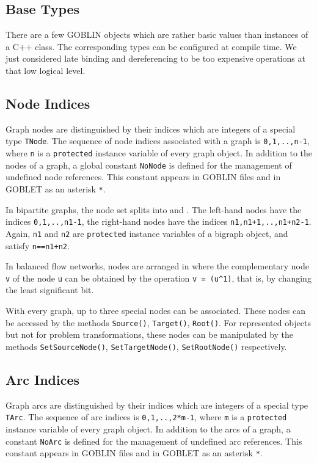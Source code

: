 \documentclass[a4paper,11pt,twoside]{book}
\begin{document}
\begin{multicols}{2}
\section{Base Types}

There are a few GOBLIN objects which are rather basic values than instances
of a C++ class. The corresponding types can be configured at compile time.
We just considered late binding and dereferencing to be too expensive
operations at that low logical level.


\subsection{Node Indices}

Graph nodes are distinguished by their indices which are integers of a special
type \verb/TNode/. The sequence of node indices associated with a graph is
\verb/0,1,..,n-1/, where \verb/n/ is a \verb/protected/ instance variable of
every graph object. In addition to the nodes of a graph, a global constant
\verb/NoNode/ is defined for the management of undefined node references. This
constant appears in GOBLIN files and in GOBLET as an asterisk \verb/*/.

In bipartite graphs, the node set splits into  and
. The left-hand nodes have the indices \verb/0,1,..,n1-1/,
the right-hand nodes have the indices \verb/n1,n1+1,..,n1+n2-1/. Again, \verb/n1/
and \verb/n2/ are \verb/protected/ instance variables of a bigraph object, and
satisfy \verb/n==n1+n2/.

In balanced flow networks, nodes are arranged in  where
the complementary node \verb/v/ of the node \verb/u/ can be obtained by the
operation \verb/v = (u^1)/, that is, by changing the least significant bit.

With every graph, up to three special nodes can be associated. These nodes can
be accessed by the methods \verb/Source()/, \verb/Target()/, \verb/Root()/. For
represented objects but not for problem transformations, these nodes can be
manipulated by the methods \verb/SetSourceNode()/, \verb/SetTargetNode()/,
\verb/SetRootNode()/ respectively.


\subsection{Arc Indices}

Graph arcs are distinguished by their indices which are integers of a special
type \verb/TArc/. The sequence of arc indices is \verb/0,1,..,2*m-1/, where
\verb/m/ is a \verb/protected/ instance variable of every graph object. In
addition to the arcs of a graph, a constant \verb/NoArc/ is defined for
the management of undefined arc references. This constant appears
in GOBLIN files and in GOBLET as an asterisk \verb/*/.


\end{multicols}
\end{document}
